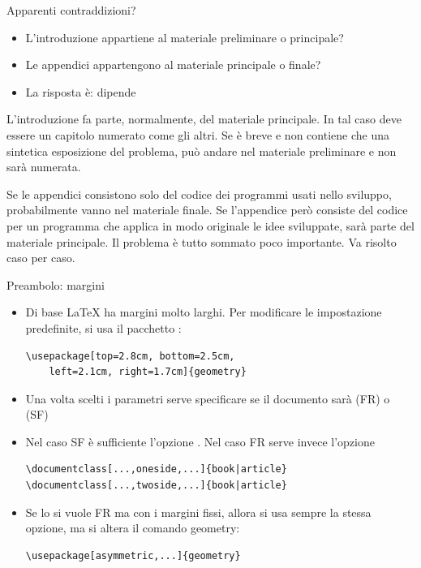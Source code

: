 \documentclass{beamer}
\begin{document}
\begin{frame}{Apparenti contraddizioni?}
\begin{itemize}
\item L'introduzione appartiene al materiale preliminare o principale?
\item Le appendici appartengono al materiale principale o finale?
\item La risposta \`e: \alert{dipende}
\end{itemize}
\bigskip
\small
L'introduzione fa parte, normalmente, del materiale principale. In tal caso deve essere un
capitolo numerato come gli altri. Se \`e breve e non contiene che una sintetica esposizione del problema, pu\`o andare nel materiale preliminare e non sar\`a numerata.

\bigskip
Se le appendici consistono solo del codice dei programmi usati nello sviluppo,
probabilmente vanno nel materiale finale. Se l'appendice però consiste del codice per un
programma che applica in modo originale le idee sviluppate, sar\`a parte del materiale
principale. Il problema \`e tutto sommato poco importante. Va risolto caso per caso.\end{frame}

\begin{frame}[fragile]{Preambolo: margini}

\begin{itemize}
\item Di base \LaTeX{} ha margini molto larghi. Per modificare le impostazione predefinite, si usa il pacchetto :

\begin{verbatim}
\usepackage[top=2.8cm, bottom=2.5cm,
	left=2.1cm, right=1.7cm]{geometry}
\end{verbatim}
\item Una volta scelti i parametri serve specificare se il documento sar\`a  (FR) o  (SF)
\item Nel caso SF \`e sufficiente l'opzione . Nel caso FR serve invece l'opzione 
\begin{verbatim}
\documentclass[...,oneside,...]{book|article}
\documentclass[...,twoside,...]{book|article}
\end{verbatim}
\item Se lo si vuole FR ma con i margini fissi, allora si usa sempre la stessa opzione, ma si altera il comando geometry:
\begin{verbatim}
\usepackage[asymmetric,...]{geometry}
\end{verbatim}
\end{itemize}

\end{frame}
\end{document}
